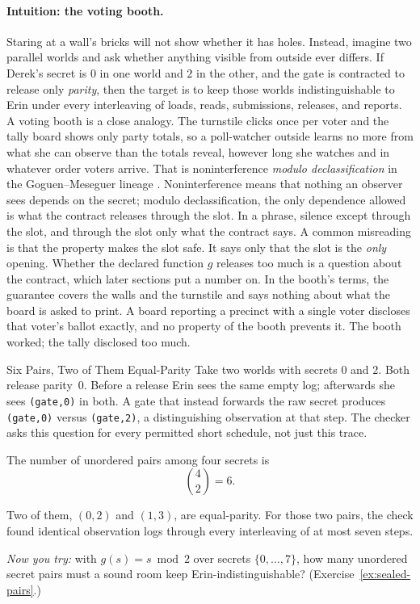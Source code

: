 \documentclass[11pt,a4paper]{article}
\theoremstyle{definition}
\begin{document}
\paragraph{Intuition: the voting booth.} %
Staring at a wall's bricks will not show whether it has holes. Instead, imagine two
parallel worlds and ask whether anything visible from outside ever differs.
If Derek's secret is $0$ in one world and $2$ in the other, and the gate is
contracted to release only \emph{parity}, then the target is to keep those
worlds indistinguishable to Erin under every interleaving of loads, reads,
submissions, releases, and reports. A voting booth is a close analogy. The
turnstile clicks once per voter and the tally board shows only party totals,
so a poll-watcher outside learns no more from what she can observe than the
totals reveal, however long she watches and in whatever order voters arrive.
That is noninterference \emph{modulo declassification} in the
Goguen--Meseguer lineage .
Noninterference means that nothing an observer sees depends on the secret;
modulo declassification, the only dependence allowed is what the contract
releases through the slot. In a phrase, silence except through the slot, and
through the slot only what the contract says. A common misreading is that the property makes the
slot safe. It says only that the slot is the \emph{only} opening. Whether the
declared function $g$ releases too much is a question about the contract,
which later sections put a number on. In the booth's terms, the guarantee
covers the walls and the turnstile and says nothing about what the board is
asked to print. A board reporting a precinct with a single voter discloses
that voter's ballot exactly, and no property of the booth prevents it. The
booth worked; the tally disclosed too much.

\begin{pdexample}{Six Pairs, Two of Them Equal-Parity}
\setlength{\parskip}{4pt plus 1pt}
Take two worlds with secrets $0$ and $2$. Both release parity~0. Before a
release Erin sees the same empty log; afterwards she sees \texttt{(gate,0)}
in both. A gate that instead forwards the raw secret produces
\texttt{(gate,0)} versus \texttt{(gate,2)}, a distinguishing \mbox{observation} at
that step. The checker asks this question for every permitted short schedule,
not just this trace.

The number of unordered pairs among four secrets is
\[
\binom{4}{2}=6.
\]

Two of them, $(0,2)$ and $(1,3)$, are equal-parity. For those two pairs, the check found identical
observation logs through every interleaving of at most seven steps.

\emph{Now you try:}
with $g(s)=s\bmod 2$ over secrets $\{0,\dots,7\}$, how many unordered secret
pairs must a sound room keep Erin-indistinguishable?
(Exercise~\ref{ex:sealed-pairs}.)
\end{pdexample}
\end{document}
